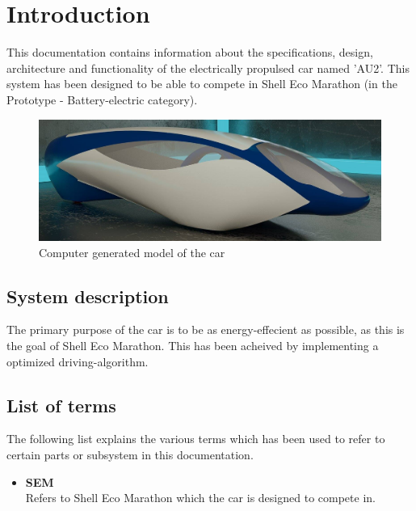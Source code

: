 \chapter{Introduction}
This documentation contains information about the specifications, design, architecture and functionality of the electrically propulsed car named 'AU2'. This system has been designed to be able to compete in Shell Eco Marathon (in the Prototype - Battery-electric category).

\begin{figure}[H]
	\centering
	\includegraphics[width=0.5\linewidth]{Introduction/Model}
	\caption{Computer generated model of the car}
	\label{fig:System_model}
\end{figure}

\section{System description}
The primary purpose of the car is to be as energy-effecient as possible, as this is the goal of Shell Eco Marathon. This has been acheived by implementing a optimized driving-algorithm.

\section{List of terms}
The following list explains the various terms which has been used to refer to certain parts or subsystem in this documentation.

\begin{itemize}
	\item \textbf{SEM}\\
	Refers to Shell Eco Marathon which the car is designed to compete in.
\end{itemize}